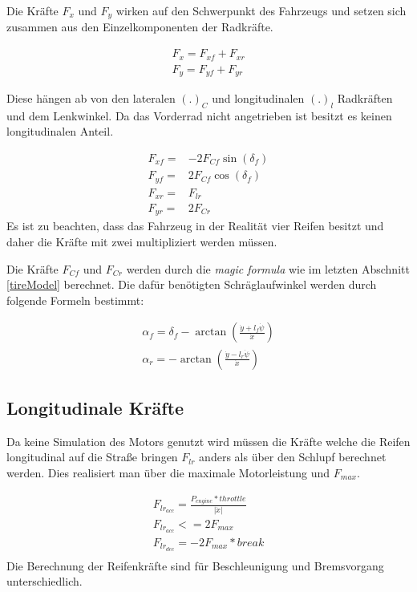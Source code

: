 \documentclass{like}
\begin{document}
Die Kräfte \(F_{x}\) und \(F_{y}\) wirken auf den Schwerpunkt des Fahrzeugs und setzen sich zusammen aus den Einzelkomponenten der Radkräfte.

\begin{eqnarray}
F_x = F_{xf} + F_{xr} \\
F_y = F_{yf} + F_{yr}
\end{eqnarray}

Diese hängen ab von den lateralen \((.)_C\) und longitudinalen \((.)_l\)    Radkräften und dem Lenkwinkel. Da das Vorderrad nicht angetrieben ist besitzt es keinen longitudinalen Anteil. 

\begin{eqnarray}
F_{xf} =& - 2 F_{Cf} \sin(\delta_f) \\
F_{yf} =& 2 F_{Cf} \cos(\delta_f) \\
F_{xr} =&   F_{lr} \\
F_{yr} =& 2 F_{Cr}
\end{eqnarray}
Es ist zu beachten, dass das Fahrzeug in der Realität vier Reifen besitzt und daher die Kräfte mit zwei multipliziert werden müssen.


Die Kräfte \(F_{Cf}\) und \(F_{Cr}\) werden durch die \textit{magic formula} wie im letzten Abschnitt \ref{tireModel} berechnet.
Die dafür benötigten Schräglaufwinkel werden durch folgende Formeln bestimmt:

\begin{eqnarray}
\alpha_f = \delta_f - \arctan(\frac{\dot{y} + l_f \dot{\psi}}{\dot{x}}) \\
\alpha_r = - \arctan(\frac{\dot{y} - l_r \dot{\psi}}{\dot{x}})
\end{eqnarray}

\subsection*{Longitudinale Kräfte}
Da keine Simulation des Motors genutzt wird müssen die Kräfte welche die Reifen longitudinal auf die Straße bringen \(F_{lr}\) anders als über den Schlupf berechnet werden.
Dies realisiert man über die maximale Motorleistung und \(F_{max}\).

\begin{eqnarray}
F_{lr_{acc}} = \frac{P_{engine} * throttle }{|\dot{x}|} \label{long_dyn_engine}\\
F_{lr_{acc}} <= 2 F_{max} \label{long_dyn_max}\\
F_{lr_{dec}} = - 2 F_{max} * break\\
\end{eqnarray}
Die Berechnung der Reifenkräfte sind für Beschleunigung und Bremsvorgang unterschiedlich.
\end{document}
